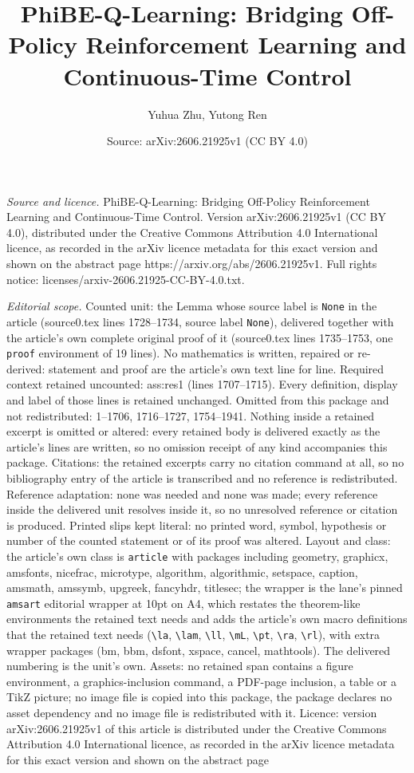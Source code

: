 \documentclass[10pt,a4paper]{amsart}
\title[PhiBE-Q-Learning: Bridging Off-Policy Reinforcement Learning]{PhiBE-Q-Learning: Bridging Off-Policy Reinforcement Learning and Continuous-Time Control}
\author{Yuhua Zhu, Yutong Ren}
\date{Source: arXiv:2606.21925v1 (CC BY 4.0)}
\begin{document}
\maketitle

\noindent\emph{Source and licence.} PhiBE-Q-Learning: Bridging Off-Policy Reinforcement Learning and Continuous-Time Control. Version arXiv:2606.21925v1 (CC BY 4.0), distributed under the Creative Commons Attribution 4.0 International licence, as recorded in the arXiv licence metadata for this exact version and shown on the abstract page https://arxiv.org/abs/2606.21925v1. Full rights notice: licenses/arxiv-2606.21925-CC-BY-4.0.txt.\par\smallskip

\noindent\textit{Editorial scope.} Counted unit: the Lemma whose source label is \texttt{None} in the article (source0.tex lines 1728--1734, source label \texttt{None}), delivered together with the article's own complete original proof of it (source0.tex lines 1735--1753, one \texttt{proof} environment of 19 lines). No mathematics is written, repaired or re-derived: statement and proof are the article's own text line for line. Required context retained uncounted: ass:res1 (lines 1707--1715). Every definition, display and label of those lines is retained unchanged. Omitted from this package and not redistributed: 1--1706, 1716--1727, 1754--1941. Nothing inside a retained excerpt is omitted or altered: every retained body is delivered exactly as the article's lines are written, so no omission receipt of any kind accompanies this package. Citations: the retained excerpts carry no citation command at all, so no bibliography entry of the article is transcribed and no reference is redistributed. Reference adaptation: none was needed and none was made; every reference inside the delivered unit resolves inside it, so no unresolved reference or citation is produced. Printed slips kept literal: no printed word, symbol, hypothesis or number of the counted statement or of its proof was altered. Layout and class: the article's own class is \texttt{article} with packages including geometry, graphicx, amsfonts, nicefrac, microtype, algorithm, algorithmic, setspace, caption, amsmath, amssymb, upgreek, fancyhdr, titlesec; the wrapper is the lane's pinned \texttt{amsart} editorial wrapper at 10pt on A4, which restates the theorem-like environments the retained text needs and adds the article's own macro definitions that the retained text needs (\texttt{\textbackslash la}, \texttt{\textbackslash lam}, \texttt{\textbackslash ll}, \texttt{\textbackslash mL}, \texttt{\textbackslash pt}, \texttt{\textbackslash ra}, \texttt{\textbackslash rl}), with extra wrapper packages (bm, bbm, dsfont, xspace, cancel, mathtools). The delivered numbering is the unit's own. Assets: no retained span contains a figure environment, a graphics-inclusion command, a PDF-page inclusion, a table or a TikZ picture; no image file is copied into this package, the package declares no asset dependency and no image file is redistributed with it. Licence: version arXiv:2606.21925v1 of this article is distributed under the Creative Commons Attribution 4.0 International licence, as recorded in the arXiv licence metadata for this exact version and shown on the abstract page 
\end{document}
